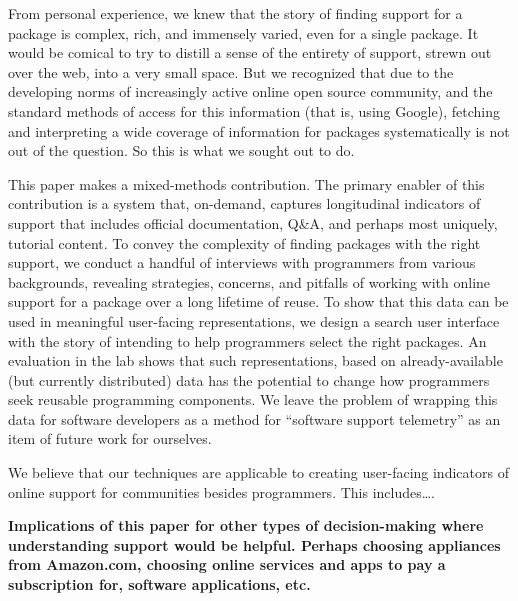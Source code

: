 From personal experience, we knew that the story of finding support for a package is complex, rich, and immensely varied, even for a single package.
It would be comical to try to distill a sense of the entirety of support, strewn out over the web, into a very small space.
But we recognized that due to the developing norms of increasingly active online open source community, and the standard methods of access for this information (that is, using Google), fetching and interpreting a wide coverage of information for packages systematically is not out of the question.
So this is what we sought out to do.

This paper makes a mixed-methods contribution.
The primary enabler of this contribution is a system that, on-demand, captures longitudinal indicators of support that includes official documentation, Q\&A, and perhaps most uniquely, tutorial content.
To convey the complexity of finding packages with the right support, we conduct a handful of interviews with programmers from various backgrounds, revealing strategies, concerns, and pitfalls of working with online support for a package over a long lifetime of reuse.
To show that this data can be used in meaningful user-facing representations, we design a search user interface with the story of intending to help programmers select the right packages.
An evaluation in the lab shows that such representations, based on already-available (but currently distributed) data has the potential to change how programmers seek reusable programming components.
We leave the problem of wrapping this data for software developers as a method for ``software support telemetry'' as an item of future work for ourselves.

We believe that our techniques are applicable to creating user-facing indicators of online support for communities besides programmers.
This includes\ldots{}.
\fi

\textbf{
Implications of this paper for other types of decision-making where understanding support would be helpful.
Perhaps choosing appliances from Amazon.com, choosing online services and apps to pay a subscription for, software applications, etc.
}
